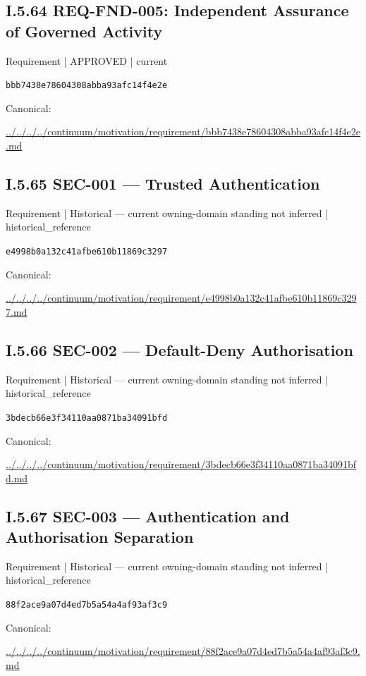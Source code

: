 \documentclass[10pt,a4paper]{article}
\begin{document}
\subsection*{I.5.64 REQ-FND-005: Independent Assurance of Governed Activity}
\label{element-bbb7438e78604308abba93afc14f4e2e}
{\small Requirement | APPROVED | current}\par
\texttt{bbb7438e78604308abba93afc14f4e2e}\par
Canonical: \par
{\footnotesize\url{../../../../continuum/motivation/requirement/bbb7438e78604308abba93afc14f4e2e.md}}\par
\subsection*{I.5.65 SEC-001 — Trusted Authentication}
\label{element-e4998b0a132c41afbe610b11869c3297}
{\small Requirement | Historical — current owning-domain standing not inferred | historical\_reference}\par
\texttt{e4998b0a132c41afbe610b11869c3297}\par
Canonical: \par
{\footnotesize\url{../../../../continuum/motivation/requirement/e4998b0a132c41afbe610b11869c3297.md}}\par
\subsection*{I.5.66 SEC-002 — Default-Deny Authorisation}
\label{element-3bdecb66e3f34110aa0871ba34091bfd}
{\small Requirement | Historical — current owning-domain standing not inferred | historical\_reference}\par
\texttt{3bdecb66e3f34110aa0871ba34091bfd}\par
Canonical: \par
{\footnotesize\url{../../../../continuum/motivation/requirement/3bdecb66e3f34110aa0871ba34091bfd.md}}\par
\subsection*{I.5.67 SEC-003 — Authentication and Authorisation Separation}
\label{element-88f2ace9a07d4ed7b5a54a4af93af3c9}
{\small Requirement | Historical — current owning-domain standing not inferred | historical\_reference}\par
\texttt{88f2ace9a07d4ed7b5a54a4af93af3c9}\par
Canonical: \par
{\footnotesize\url{../../../../continuum/motivation/requirement/88f2ace9a07d4ed7b5a54a4af93af3c9.md}}\par
\end{document}
